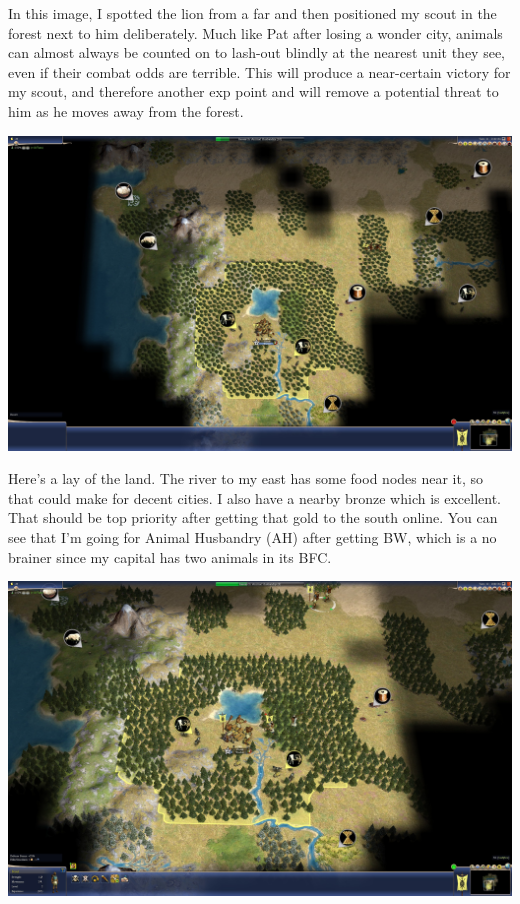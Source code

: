 \documentclass[10pt]{article}
\begin{document}
In this image, I spotted the lion from a far and then positioned my scout in the forest next
to him deliberately. Much like Pat after losing a wonder city, animals can almost always be counted on
to lash-out blindly at the nearest unit they see, even if their combat odds are terrible. This will produce
a near-certain victory for my scout, and therefore another exp point and will remove a potential threat
to him as he moves away from the forest.

\includegraphics[width=1.0\textwidth]{7}

Here's a lay of the land. The river to my east has some food nodes near it, so that could make for
decent cities. I also have a nearby bronze which is excellent. That should be top priority after getting
that gold to the south online. You can see that I'm going for Animal Husbandry (AH) after getting BW, which is a
no brainer since my capital has two animals in its BFC.

\includegraphics[width=1.0\textwidth]{8}
\end{document}
